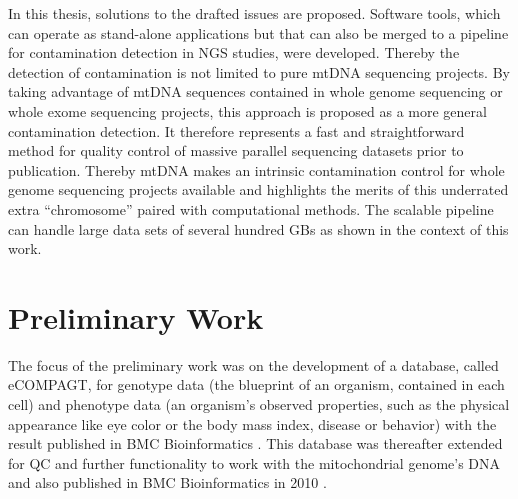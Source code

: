 In this thesis, solutions to the drafted issues are proposed. Software tools, which can operate as stand-alone applications but that can also be merged to a pipeline for contamination detection in NGS studies, were developed. Thereby the detection of contamination is not limited to pure mtDNA sequencing projects. By taking advantage of  mtDNA sequences contained in whole genome sequencing or whole exome sequencing projects, this approach is proposed as a more general contamination detection. It therefore represents a fast and straightforward method for quality control of massive parallel sequencing datasets prior to publication. Thereby mtDNA makes an intrinsic contamination control for whole genome sequencing projects available and highlights the merits of this underrated extra “chromosome” paired with computational methods. The scalable pipeline can handle large data sets of several hundred GBs as shown in the context of this work. 

\section{Preliminary Work}
\label{prelimWork}
The focus of the preliminary work was on the development of a database, called eCOMPAGT, for genotype data (the blueprint of an organism, contained in each cell) and phenotype data (an organism's observed properties, such as the physical appearance like eye color or the body mass index, disease or behavior) with the result published in BMC Bioinformatics \cite{Schoenherr2009}. This database was thereafter extended for QC and further functionality to work with the mitochondrial genome's DNA and also published in BMC Bioinformatics in 2010 \cite{Weissensteiner2010}. 


